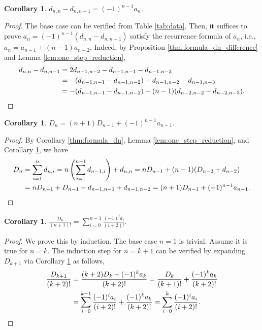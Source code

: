 \documentclass[reqno,11pt]{article} %
\newtheorem{corollary}[theorem]{Corollary}
\theoremstyle{remark}
\begin{document}
\begin{corollary}   \label{cor:dn_an}
    $d_{n,n} - d_{n,n-1} = (-1)^{n-1} a_n$.   
\end{corollary}

\begin{proof}
    The base case can be verified from Table \ref{tab:data}. Then, it suffices to prove 
        $a_n = (-1)^{n-1} (d_{n,n} - d_{n,n-1})$
    satisfy the recurrence formula of $a_n$, i.e.,
        $a_n = a_{n-1} + (n-1) a_{n-2}$.
    Indeed, by Proposition \ref{thm:formula_dn_difference} and Lemma \ref{lem:one_step_reduction},
    \begin{align*}
        d_{n,n} - d_{n,n-1}
        &= 2d_{n-1,n-2} - d_{n-1,n-1} - d_{n-1,n-3} \\
        &= - (d_{n-1,n-1} - d_{n-1,n-2}) + d_{n-1,n-2} - d_{n-1,n-3} \\
        &= - (d_{n-1,n-1} - d_{n-1,n-2}) + (n-1) (d_{n-2,n-2} - d_{n-2,n-3}).   \qedhere
    \end{align*}
\end{proof}






\begin{corollary}   \label{cor:Dn_recursion}
    $D_n = (n+1) D_{n-1} + (-1)^{n-1} a_{n-1}$.
\end{corollary}

\begin{proof}
    By Corollary \ref{thm:formula_dn}, Lemma \ref{lem:one_step_reduction}, and Corollary \ref{cor:dn_an}, we have
    \begin{align*}
        D_n 
        &= \sum_{i=1}^n d_{n,i} 
        = n \left(\sum_{i=1}^{n-1} d_{n-1,i} \right) + d_{n,n} 
        = n D_{n-1} + (n-1)(D_{n-2} + d_{n-2}) \\
        &= n D_{n-1} + D_{n-1} - d_{n-1,n-1} + d_{n-1,n-2}  = (n+1) D_{n-1} + (-1)^{n-1} a_{n-1}.  \qedhere
    \end{align*}
\end{proof}

\begin{corollary}
\label{cor:Dn_ratio}
    $\frac{D_n}{(n+1)!} = \sum_{i=0}^{n-1} \frac{(-1)^i a_i}{(i+2)!}$.
\end{corollary}

\begin{proof}
    We prove this by induction. The base case $n=1$ is trivial. Assume it is true for $n=k$. The induction step for $n=k+1$ can be verified by expanding $D_{k+1}$ via Corollary \ref{cor:Dn_recursion} as follows,
    \begin{align*}
    \frac{D_{k+1}}{(k+2)!} &= \frac{(k+2)D_k + (-1)^k a_k}{(k+2)!} = \frac{D_{k}}{(k+1)!} + \frac{(-1)^k a_k}{(k+2)!} \\
    &= \sum_{i=0}^{k-1} \frac{(-1)^i a_i}{(i+2)!} +\frac{(-1)^k a_k}{(k+2)!} =
    \sum_{i=0}^k \frac{(-1)^i a_i}{(i+2)!}. \qedhere
     \end{align*}
\end{proof}
\end{document}
